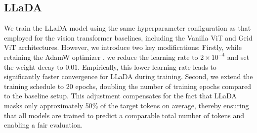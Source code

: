 \subsection{LLaDA} \label{sec:llada_training_details_appendix}
We train the LLaDA model using the same hyperparameter configuration as that employed for the vision transformer baselines, including the Vanilla ViT and Grid ViT architectures. However, we introduce two key modifications:
Firstly, while retaining the AdamW optimizer \citep{Loshchilov_AdamW_2019}, we reduce the learning rate to $2 \times 10^{-4}$ and set the weight decay to $0.01$. Empirically, this lower learning rate leads to significantly faster convergence for LLaDA during training.
Second, we extend the training schedule to 20 epochs, doubling the number of training epochs compared to the baseline setup. This adjustment compensates for the fact that LLaDA masks only approximately 50\% of the target tokens on average, thereby ensuring that all models are trained to predict a comparable total number of tokens and enabling a fair evaluation.



